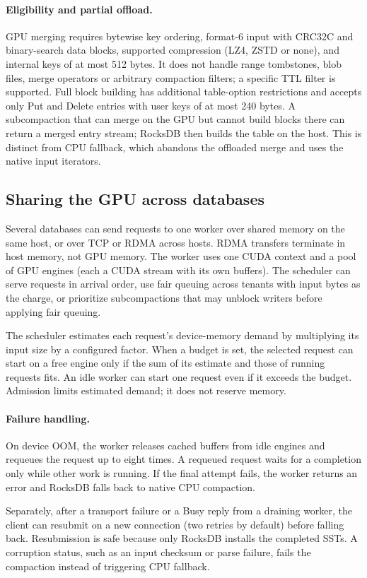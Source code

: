 \documentclass[sigconf, nonacm]{acmart}
\begin{document}
\paragraph{Eligibility and partial offload.}
GPU merging requires bytewise key ordering, format-6 input with CRC32C and
binary-search data blocks, supported compression (LZ4, ZSTD or none), and internal
keys of at most 512 bytes. It does not handle range tombstones, blob files, merge
operators or arbitrary compaction filters; a specific TTL filter is supported.
Full block building has additional table-option restrictions and accepts only Put
and Delete entries with user keys of at most 240 bytes. A subcompaction that can
merge on the GPU but cannot build blocks there can return a merged entry stream;
RocksDB then builds the table on the host. This is distinct from CPU fallback,
which abandons the offloaded merge and uses the native input iterators.

\subsection{Sharing the GPU across databases}

Several databases can send requests to one worker over shared memory on the same
host, or over TCP or RDMA across hosts. RDMA transfers terminate in host memory,
not GPU memory. The worker uses one CUDA context and a pool of GPU engines (each a
CUDA stream with its own buffers). The scheduler can serve requests in arrival order,
use fair queuing across tenants with input bytes as the charge, or prioritize
subcompactions that may unblock writers before applying fair queuing.

The scheduler estimates each request's device-memory demand by multiplying its input
size by a configured factor. When a budget is set, the selected request can start on
a free engine only if the sum of its estimate and those of running requests fits.
An idle worker can start one request even if it exceeds the budget. Admission
limits estimated demand; it does not reserve memory.

\paragraph{Failure handling.}
On device OOM, the worker releases cached buffers from idle engines and requeues the
request up to eight times. A requeued request waits for a completion only while
other work is running. If the final attempt fails, the worker returns an error and
RocksDB falls back to native CPU compaction.

Separately, after a transport failure or a Busy reply from a draining worker, the
client can resubmit on a new connection (two retries by default) before falling back.
Resubmission is safe because only RocksDB installs the completed SSTs. A corruption
status, such as an input checksum or parse failure, fails the compaction instead of
triggering CPU fallback.



\end{document}
